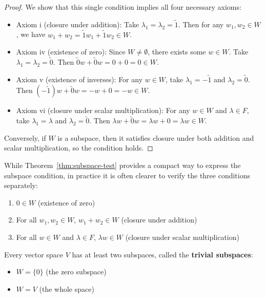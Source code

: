 \begin{proof}
    We show that this single condition implies all four necessary axioms:
    \begin{itemize}
        \item Axiom i (closure under addition): Take $\lambda_1 = \lambda_2 = \tilde{1}$. Then for any $w_1, w_2 \in W$, we have $w_1 + w_2 = \tilde{1}w_1 + \tilde{1}w_2 \in W$.
        
        \item Axiom iv (existence of zero): Since $W \neq \emptyset$, there exists some $w \in W$. Take $\lambda_1 = \lambda_2 = \tilde{0}$. Then $\tilde{0}w + \tilde{0}w = 0 + 0 = 0 \in W$.
        
        \item Axiom v (existence of inverses): For any $w \in W$, take $\lambda_1 = -\tilde{1}$ and $\lambda_2 = \tilde{0}$. Then $(-\tilde{1})w + \tilde{0}w = -w + 0 = -w \in W$.
        
        \item Axiom vi (closure under scalar multiplication): For any $w \in W$ and $\lambda \in F$, take $\lambda_1 = \lambda$ and $\lambda_2 = \tilde{0}$. Then $\lambda w + \tilde{0}w = \lambda w + 0 = \lambda w \in W$.
    \end{itemize}
    
    Conversely, if $W$ is a subspace, then it satisfies closure under both addition and scalar multiplication, so the condition holds.
\end{proof}

\begin{note}
    While Theorem~\ref{thm:subspace-test} provides a compact way to express the subspace condition, in practice it is often clearer to verify the three conditions separately:
    \begin{enumerate}[label=\roman*.]
        \item $0 \in W$ (existence of zero)
        \item For all $w_1, w_2 \in W$, $w_1 + w_2 \in W$ (closure under addition)
        \item For all $w \in W$ and $\lambda \in F$, $\lambda w \in W$ (closure under scalar multiplication)
    \end{enumerate}
\end{note}

\begin{note}
    Every vector space $V$ has at least two subspaces, called the \textbf{trivial subspaces}:
    \begin{itemize}
        \item $W = \{0\}$ (the zero subspace)
        \item $W = V$ (the whole space)
    \end{itemize}
\end{note}